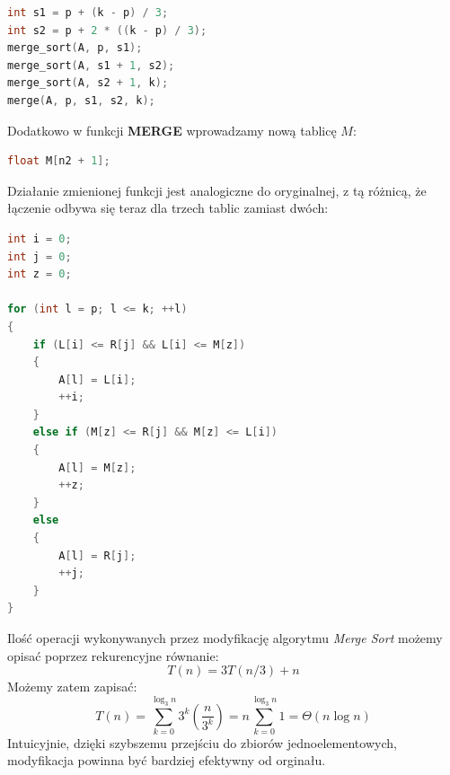\documentclass{article}
\begin{document}
\begin{lstlisting}[style=mystyle, language=C++, caption={Fragment implementacji modyfikacji \texttt{Merge Sort}}, label={lst:mergesort2}]
int s1 = p + (k - p) / 3;
int s2 = p + 2 * ((k - p) / 3);
merge_sort(A, p, s1);
merge_sort(A, s1 + 1, s2);
merge_sort(A, s2 + 1, k);
merge(A, p, s1, s2, k);
\end{lstlisting}

Dodatkowo w funkcji \textbf{MERGE} wprowadzamy nową tablicę $M$:
\begin{lstlisting}[style=mystyle, language=C++, caption={Fragment implementacji modyfikacji \texttt{Merge}}, label={lst:merge2}]
float M[n2 + 1];
\end{lstlisting}

Działanie zmienionej funkcji jest analogiczne do oryginalnej, z tą różnicą, że łączenie odbywa się teraz dla trzech tablic zamiast dwóch:
\begin{lstlisting}[style=mystyle, language=C++, caption={Fragment implementacji modyfikacji \texttt{Merge}}, label={lst:merge2l}]
int i = 0;
int j = 0;
int z = 0;

for (int l = p; l <= k; ++l)
{
    if (L[i] <= R[j] && L[i] <= M[z])
    {
        A[l] = L[i];
        ++i;
    }
    else if (M[z] <= R[j] && M[z] <= L[i])
    {
        A[l] = M[z];
        ++z;
    }
    else
    {
        A[l] = R[j];
        ++j;
    }
}
\end{lstlisting}
Ilość operacji wykonywanych przez modyfikację algorytmu \textit{Merge Sort} możemy opisać poprzez rekurencyjne równanie:
\[
    T(n) = 3T(n/3) + n
\]
Możemy zatem zapisać:
\[
    T(n) = \sum_{k=0}^{\log_3 n} 3^k\left(\frac{n}{3^k}\right) = n\sum_{k=0}^{\log_3 n} 1 = \Theta(n \log n)
\]
Intuicyjnie, dzięki szybszemu przejściu do zbiorów jednoelementowych, modyfikacja powinna być bardziej efektywny od orginału.
\end{document}
